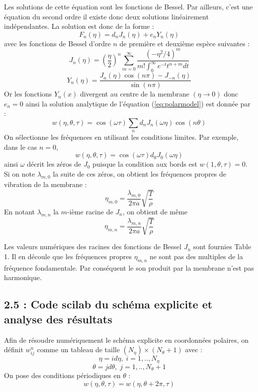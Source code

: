 \documentclass[a4,12pt]{article}
\begin{document}
			    Les solutions de cette équation sont les fonctions de Bessel. Par ailleurs, c'est une équation du second ordre il existe donc deux solutions linéairement indépendantes. La solution est donc de la forme :
			    \[
			      F_n(\eta)=d_nJ_n(\eta)+e_nY_n(\eta)
			    \]
			    avec les fonctions de Bessel d'ordre $n$ de première et deuxième espèce suivantes :
			    \[
			      J_n(\eta)=\left(\dfrac{\eta}{2}\right)^n\sum_{m=0}^{\infty} \dfrac{(-\eta^2/4)^m}{m!\int_0^{\infty}e^{-t}t^{n+m}dt}
			    \]
			    \[
			      Y_n(\eta)=\dfrac{J_n(\eta)\cos(n\pi)-J_{-n}(\eta)}{\sin(n\pi)}
			    \]
			    Or les fonctions $Y_n(x)$ divergent au centre de la membrane $(\eta\rightarrow 0)$ donc $e_n=0$
			    ainsi la solution analytique de l'équation (\ref{eq:polarmodel}) est donnée par :
			    \[
			      w(\eta,\theta,\tau)=\cos(\omega \tau)\sum_n d_nJ_n(\omega\eta)\cos(n\theta)
			    \]
			    On sélectionne les fréquences en utilisant les conditions limites. Par exemple, dans le cas $n=0$, 
			    \[
			      w(\eta,\theta,\tau)=\cos(\omega \tau) d_0J_0(\omega \eta)
			    \]
			    ainsi $\omega$ décrit les zéros de $J_0$ puisque la condition aux bords est $w(1,\theta,\tau)=0$. Si on note $\lambda_{m,0}$ la suite de ces zéros, on obtient les fréquences propres de vibration de la membrane :
			    \[
			      \eta_{m,0}=\dfrac{\lambda_{m,0}}{2\pi a} \sqrt{\frac{T}{\rho}}
			    \]
			    En notant $\lambda_{m,n}$ la $m$-ième racine de $J_n$, on obtient de même 
			    \[
			      \eta_{m,n}=\dfrac{\lambda_{m,n}}{2\pi a} \sqrt{\frac{T}{\rho}}
			    \]

			    Les valeurs numériques des racines des fonctions de Bessel $J_n$ sont fournies Table 1. Il en découle que les fréquences propres $\eta_{m,n}$ ne sont pas des multiples de la fréquence fondamentale. Par conséquent le son produit par la membrane n'est pas harmonique.

			    \newpage 

			    \subsection*{2.5 : Code scilab du schéma explicite et analyse des résultats}

			    Afin de résoudre numériquement le schéma explicite en coordonnées polaires, on définit $w_{ij}^n$ comme un tableau de taille $(N_\eta)\times(N_\theta+1)$ avec :
			    \[
			      \eta=id\eta ,\;i=1,..,N_\eta
			    \]
			    \[
			      \theta=jd\theta ,\;j=1,..,N_\theta+1
			    \]
			    On pose des conditions périodiques en $\theta$ :
			    \[
			      w(\eta,\theta,\tau)=w(\eta,\theta+2\pi,\tau)
			    \]
\end{document}
